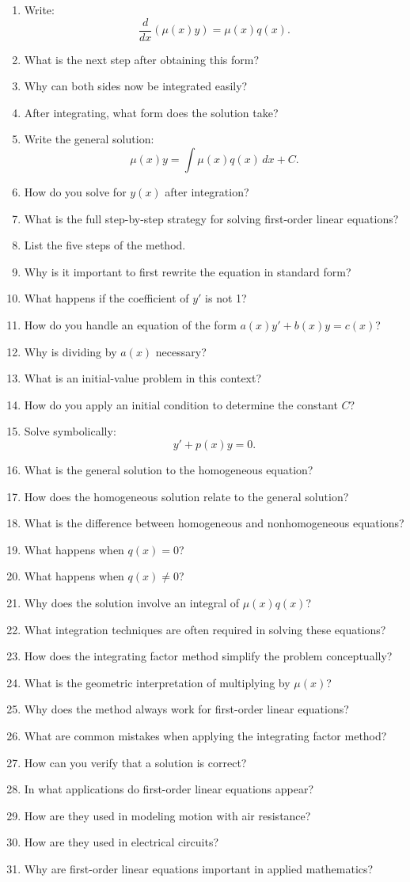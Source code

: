 \begin{enumerate}
  \item Write:
    \[ \frac{d}{dx}(\mu(x)y) = \mu(x)q(x). \]
  \item What is the next step after obtaining this form?
  \item Why can both sides now be integrated easily?
  \item After integrating, what form does the solution take?
  \item Write the general solution:
    \[ \mu(x)y = \int \mu(x)q(x)\,dx + C. \]
  \item How do you solve for \(y(x)\) after integration?
  \item What is the full step-by-step strategy for solving first-order linear equations?
  \item List the five steps of the method.
  \item Why is it important to first rewrite the equation in standard form?
  \item What happens if the coefficient of \(y'\) is not 1?
  \item How do you handle an equation of the form \(a(x)y' + b(x)y = c(x)\)?
  \item Why is dividing by \(a(x)\) necessary?
  \item What is an initial-value problem in this context?
  \item How do you apply an initial condition to determine the constant \(C\)?
  \item Solve symbolically:
    \[ y' + p(x)y = 0. \]
  \item What is the general solution to the homogeneous equation?
  \item How does the homogeneous solution relate to the general solution?
  \item What is the difference between homogeneous and nonhomogeneous equations?
  \item What happens when \(q(x)=0\)?
  \item What happens when \(q(x)\neq 0\)?
  \item Why does the solution involve an integral of \(\mu(x)q(x)\)?
  \item What integration techniques are often required in solving these equations?
  \item How does the integrating factor method simplify the problem conceptually?
  \item What is the geometric interpretation of multiplying by \(\mu(x)\)?
  \item Why does the method always work for first-order linear equations?
  \item What are common mistakes when applying the integrating factor method?
  \item How can you verify that a solution is correct?
  \item In what applications do first-order linear equations appear?
  \item How are they used in modeling motion with air resistance?
  \item How are they used in electrical circuits?
  \item Why are first-order linear equations important in applied mathematics?
\end{enumerate}
